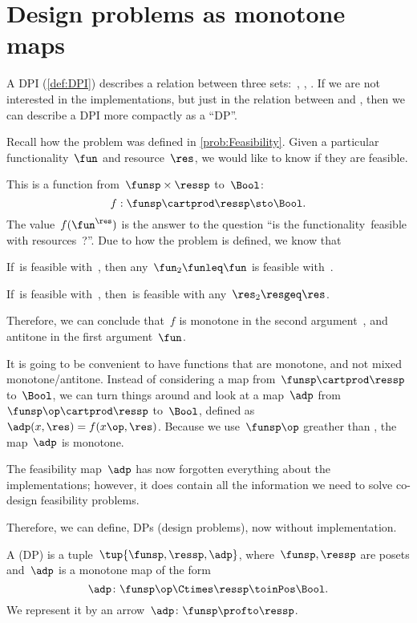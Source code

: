 

\section{Design problems as monotone maps}
\label{sec:dpdefinition}

A DPI (\cref{def:DPI}) describes a relation between three sets:~\funsp, \ressp, \impsp.
If we are not interested in the implementations, but just in the relation between \funsp and \ressp, then we can describe a DPI more compactly as a ``DP''\@.

Recall how the problem \Feasibility was defined in \cref{prob:Feasibility}.
Given a particular functionality~$\fun$ and resource~$\res$, we would like to know if they are feasible.

This is a function from~$\funsp \times \ressp$ to~$\Bool$:
\begin{equation}
  f: \funsp \cartprod \ressp \sto \Bool.
\end{equation}
The value~$f(\fun^\res)$ is the answer to the question ``is the functionality~\fun feasible with resources~\res?''. Due to how the problem is defined, we know that%
\begin{compactenum}
  \item If~\fun is feasible with~\res, then any~$\fun_2 \funleq \fun$ is feasible with~\res.
  \item If~\fun is feasible with~\res, then~\fun is feasible with any~$\res_2 \resgeq \res$.
\end{compactenum}
Therefore, we can conclude that~$f$ is monotone in the second argument~\res, and antitone in the first argument~$\fun$.

It is going to be convenient to have functions that are monotone, and not mixed
monotone/antitone.
Instead of considering a map from~$\funsp \cartprod \ressp$ to~$\Bool$, we can turn things around and look at a map~$\adp$ from~$\funsp\op \cartprod \ressp$ to~$\Bool$, defined as~$\adp(x,\res) = f(x\op,\res)$.
Because we use~$\funsp\op$ greather than \funsp, the map~$\adp$ is monotone.

The feasibility map~$\adp$ has now forgotten everything about the implementations; however, it does contain all the information we need to solve co-design feasibility problems.

Therefore, we can define, DPs (design problems), now without implementation.


\begin{definition}
  \label{def:design-problem}
  A  (DP) is a tuple~$\tup{\funsp, \ressp, \adp}$, where~$\funsp, \ressp$ are posets and~$\adp$ is a monotone map of the form%
  \begin{equation*}
    \adp \colon  \funsp\op \Ctimes \ressp \toinPos \Bool.
  \end{equation*}
  We represent it by an arrow~$\adp \colon \funsp \profto \ressp$.
\end{definition}

